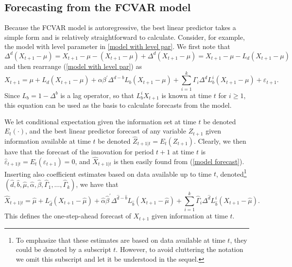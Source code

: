 \documentclass[article]{jss}
\begin{document}
\subsection{Forecasting from the FCVAR model}

Because the FCVAR model is autoregressive, the best linear predictor takes a simple form and is relatively straightforward to calculate. Consider, for example, the model with level parameter in \eqref{model with level par}. We first note that
\begin{equation}
\Delta^d (X_{t+1}-\mu) = X_{t+1}-\mu  - (X_{t+1}-\mu) + \Delta^d (X_{t+1}-\mu) = X_{t+1}-\mu - L_d (X_{t+1}-\mu)
\nonumber
\end{equation}
and then rearrange (\ref{model with level par}) as
\begin{equation}
X_{t+1}=\mu + L_d (X_{t+1}-\mu)+\alpha\beta^{\prime}\Delta^{d-b}L_{b}(X_{t+1}-\mu)+\sum
_{i=1}^{k}\Gamma_{i}\Delta^d L_{b}^{i}(X_{t+1}-\mu)+\varepsilon_{t+1}.
\label{model forecast}
\end{equation}
Since $L_{b}=1-\Delta^{b}$ is a lag operator, so that $L_{b}^{i}X_{t+1}$ is known at time $t$ for $i \geq 1$, this equation can be used as the basis to calculate forecasts from the model.

We let conditional expectation given the information set at time $t$ be denoted $E_{t}(\cdot)$, and the best linear predictor forecast of any variable $Z_{t+1}$ given information available at time $t$ be denoted $\hat{Z}_{t+1|t}=E_{t}(Z_{t+1})$. Clearly, we then have that the forecast of the innovation for period $t+1$ at time $t$ is $\hat{\varepsilon}_{t+1|t}=E_{t}(\varepsilon_{t+1})=0$, and $\hat{X}_{t+1|t}$ is then easily found from (\ref{model forecast}). Inserting also coefficient estimates based on data available up to time $t$, denoted\footnote{To emphasize that these estimates are based on data available at time $t$, they could be denoted by a subscript $t$. However, to avoid cluttering the notation we omit this subscript and let it be understood in the sequel.} $(\hat{d},\hat{b},\hat{\mu},\hat{\alpha},\hat{\beta },\hat{\Gamma}_{1},\ldots,\hat{\Gamma}_{k})$, we have that
\begin{equation}
\hat{X}_{t+1|t}=\hat{\mu}+L_{\hat{d}} (X_{t+1}-\hat{\mu})+\hat{\alpha}\hat{\beta}^{\prime}\Delta^{\hat{d}-\hat{b}
}L_{\hat{b}}(X_{t+1}-\hat{\mu})+\sum_{i=1}^{k}\hat{\Gamma}_{i}\Delta^{\hat{d}}
L_{\hat{b}}^{i}(X_{t+1}-\hat{\mu}).
\label{forecast one}
\end{equation}
This defines the one-step-ahead forecast of $X_{t+1}$ given information at time $t$. 
\end{document}
